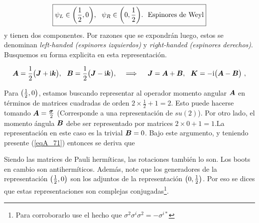 \begin{equation}
    \boxed{
    \psi_{L} \in \qty(\frac{1}{2},0), ~~\psi_{R} \in \qty(0,\frac{1}{2}).~~\text{Espinores de Weyl}
    }
\end{equation}
y tienen dos componentes. Por razones que se expondrán luego, estos se denominan \emph{left-handed (espinores izquierdos)} y \emph{right-handed (espinores derechos)}. Busquemos su forma explicita en esta representación. 

\begin{equation}
    \vb*{A} = \frac{1}{2}\qty\big( \vb*{J} + \mathrm{i} \vb*{k}), ~~\vb*{B} = \frac{1}{2}\qty\big( \vb*{J} - \mathrm{i} \vb*{k}),~~~\implies ~~~\vb*{J}=\vb*{A}+\vb*{B},~~\vb*{K} =-\mathrm{i} \qty\big(\vb*{A}-\vb*{B})~,
\end{equation}

Para $\qty(\frac{1}{2},0)$, estamos buscando representar al operador momento angular $\vb*{A}$ en términos de matrices cuadradas de orden $2\times\frac{1}{2}+1=2$. Esto puede hacerse tomando $\vb*{A}=\frac{\vb*{\sigma}}{2}$ (Corresponde a una representación de $su(2)$). Por otro lado, el momento ángula $\vb*{B}$ debe ser representado por matrices $2\times0 +1=1$.La representación en este caso es la trivial $\vb*{B}=0$. Bajo este argumento, y teniendo presente (\ref{eqA_71}) entonces se deriva que


Siendo las matrices de Pauli hermíticas, las rotaciones también lo son. Los boots en cambio son antihermíticos. Además, note que los generadores de la representación $\qty(\frac{1}{2},0)$ son los adjuntos de la representación  $\qty(0,\frac{1}{2})$. Por eso se dices que estas representaciones son  complejas conjugadas\footnote{Para corroborarlo use el hecho que $\sigma^{2}\sigma^{i}\sigma^{2}=-\sigma^{i*}$}. 

